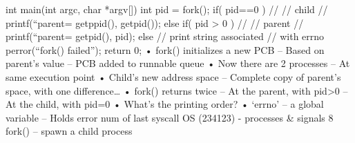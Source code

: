 \documentclass[12pt]{report}
\begin{document}
int main(int argc, char *argv[])
{
  int pid = fork();
  if( pid==0 ) { 
   //
   // child
      //
      printf(“parent=%
             getppid(), getpid());
  }
  else if( pid > 0 ) {
      //
      // parent
      //
      printf(“parent=%
             getpid(), pid);
  }
  else { // print string associated
         // with errno   
      perror(“fork() failed”); 
  }
  return 0;
}
• fork() initializes a new PCB
– Based on parent’s value
– PCB added to runnable queue
• Now there are 2 processes
– At same execution point
• Child’s new address space 
– Complete copy of parent’s 
space, with one difference…
• fork() returns twice
– At the parent, with pid>0
– At the child, with pid=0
• What’s the printing order?
• ‘errno’ – a global variable
– Holds error num of last syscall
OS (234123) - processes & signals
8
fork() – spawn a child process
\end{document}
